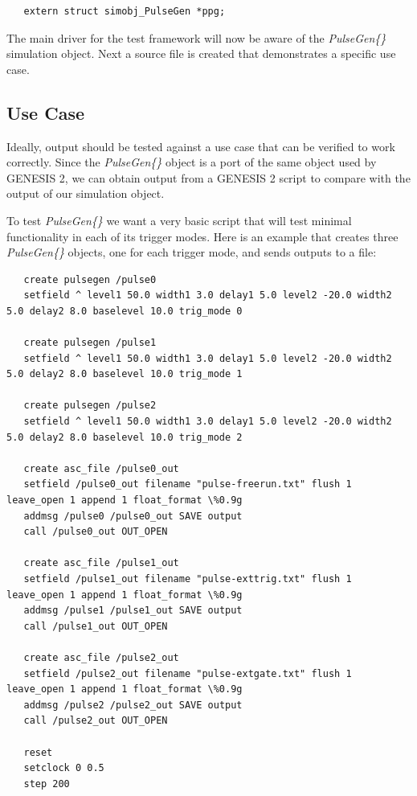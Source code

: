 \documentclass[12pt]{article}
\begin{document}
\begin{verbatim}
   extern struct simobj_PulseGen *ppg;
\end{verbatim}

The main driver for the test framework will now be aware of the {\it PulseGen\{\}} simulation object. Next a source file is created that demonstrates a specific use case.

\subsection*{Use Case}

Ideally, output should be tested against a use case that can be verified to work correctly. Since the {\it PulseGen\{\}} object is a port of the same object used by GENESIS 2, we can obtain output from a GENESIS 2 script to compare with the output of our simulation object.

To test {\it PulseGen\{\}} we want a very basic script that will test minimal functionality in each of its trigger modes. Here is an example that creates three {\it PulseGen\{\}} objects, one for each trigger mode, and sends outputs to a file:
\begin{verbatim}
   create pulsegen /pulse0
   setfield ^ level1 50.0 width1 3.0 delay1 5.0 level2 -20.0 width2 5.0 delay2 8.0 baselevel 10.0 trig_mode 0

   create pulsegen /pulse1
   setfield ^ level1 50.0 width1 3.0 delay1 5.0 level2 -20.0 width2 5.0 delay2 8.0 baselevel 10.0 trig_mode 1

   create pulsegen /pulse2
   setfield ^ level1 50.0 width1 3.0 delay1 5.0 level2 -20.0 width2 5.0 delay2 8.0 baselevel 10.0 trig_mode 2

   create asc_file /pulse0_out 
   setfield /pulse0_out filename "pulse-freerun.txt" flush 1 leave_open 1 append 1 float_format \%0.9g
   addmsg /pulse0 /pulse0_out SAVE output
   call /pulse0_out OUT_OPEN

   create asc_file /pulse1_out 
   setfield /pulse1_out filename "pulse-exttrig.txt" flush 1 leave_open 1 append 1 float_format \%0.9g
   addmsg /pulse1 /pulse1_out SAVE output
   call /pulse1_out OUT_OPEN

   create asc_file /pulse2_out 
   setfield /pulse2_out filename "pulse-extgate.txt" flush 1 leave_open 1 append 1 float_format \%0.9g
   addmsg /pulse2 /pulse2_out SAVE output
   call /pulse2_out OUT_OPEN

   reset
   setclock 0 0.5
   step 200
\end{verbatim}
\end{document}
